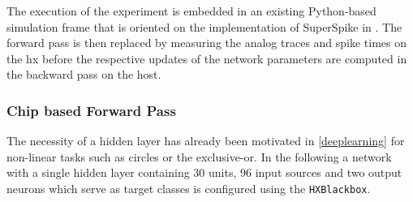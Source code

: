 The execution of the experiment is embedded in an existing Python-based simulation frame that is oriented on the implementation of SuperSpike in \citealp{zenke2018superspike}. The forward pass is then replaced by measuring the analog traces and spike times on the \gls{hx} before the respective updates of the network parameters are computed in the backward pass on the host.

\subsubsection*{Chip based Forward Pass}
The necessity of a hidden layer has already been motivated in \cref{deeplearning} for non-linear tasks such as circles or the exclusive-or. In the following a network with a single hidden layer containing 30 units, 96 input sources and two output neurons which serve as target classes is configured using the \texttt{HXBlackbox}.

